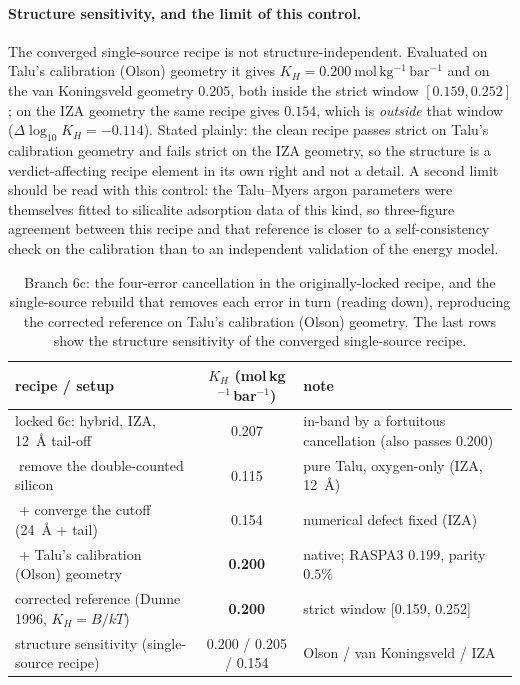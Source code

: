 \paragraph{Structure sensitivity, and the limit of this control.} The converged single-source recipe is
not structure-independent. Evaluated on Talu's calibration (Olson) geometry \cite{Olson1981JPC} it gives
\(K_H = 0.200\ \mathrm{mol\,kg^{-1}\,bar^{-1}}\) and on the van Koningsveld geometry
\cite{vanKoningsveld1987ActaCrystB} \(0.205\), both
inside the strict window \([0.159, 0.252]\); on the IZA geometry the same recipe gives \(0.154\), which
is \emph{outside} that window (\(\Delta\log_{10}K_H = -0.114\)). Stated plainly: the clean recipe passes
strict on Talu's calibration geometry and fails strict on the IZA geometry, so the structure is a
verdict-affecting recipe element in its own right and not a detail. A second limit should be read with
this control: the Talu--Myers argon parameters were themselves fitted to silicalite adsorption data of
this kind, so three-figure agreement between this recipe and that reference is closer to a
self-consistency check on the calibration than to an independent validation of the energy model.

\begin{table}[tbp]
\centering\small
\caption{Branch 6c: the four-error cancellation in the originally-locked recipe, and the single-source
rebuild that removes each error in turn (reading down), reproducing the corrected reference on Talu's
calibration (Olson) geometry. The last rows show the structure sensitivity of the converged single-source
recipe.}\label{tab:6c-cancellation}
\begin{tabular}{@{}lcl@{}}
\toprule
recipe / setup & \(K_H\) (mol\,kg\(^{-1}\)\,bar\(^{-1}\)) & note \\
\midrule
locked 6c: hybrid, IZA, 12~\AA{} tail-off & 0.207 & in-band by a fortuitous cancellation (also passes 0.200) \\
\(\;\)remove the double-counted silicon & 0.115 & pure Talu, oxygen-only (IZA, 12~\AA{}) \\
\(\;\)+ converge the cutoff (24~\AA{} + tail) & 0.154 & numerical defect fixed (IZA) \\
\(\;\)+ Talu's calibration (Olson) geometry & \textbf{0.200} & native; RASPA3 \(0.199\), parity \(0.5\%\) \\
\midrule
corrected reference (Dunne 1996, \(K_H=B/kT\)) & \textbf{0.200} & strict window [0.159, 0.252] \\
structure sensitivity (single-source recipe) & 0.200 / 0.205 / 0.154 & Olson / van Koningsveld / IZA \\
\bottomrule
\end{tabular}
\end{table}

